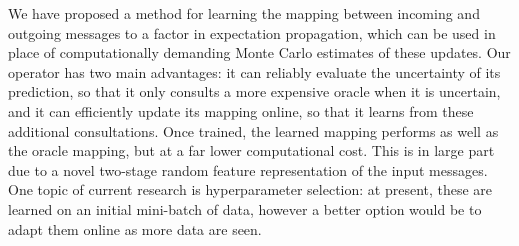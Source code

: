 \documentclass[english]{article}
\theoremstyle{plain}
\theoremstyle{plain}
\begin{document}
We have proposed a method for learning the mapping between incoming and outgoing
messages to a factor in expectation propagation, which can be used
in place of computationally demanding Monte Carlo estimates of these updates.
Our operator has two main advantages: it can reliably evaluate the uncertainty of its prediction,
so that it only consults a more expensive oracle when it is uncertain,
and it can efficiently update its mapping online, so that it learns
from these additional consultations. Once trained, the learned mapping
performs as well as the oracle mapping, but at a far lower computational cost.
This is in large part due to a novel two-stage random feature representation of the input
messages. One topic of current research is hyperparameter selection:
at present, these are learned on an initial mini-batch of data, however
a better option would be to adapt them online as more data are seen.





\end{document}
